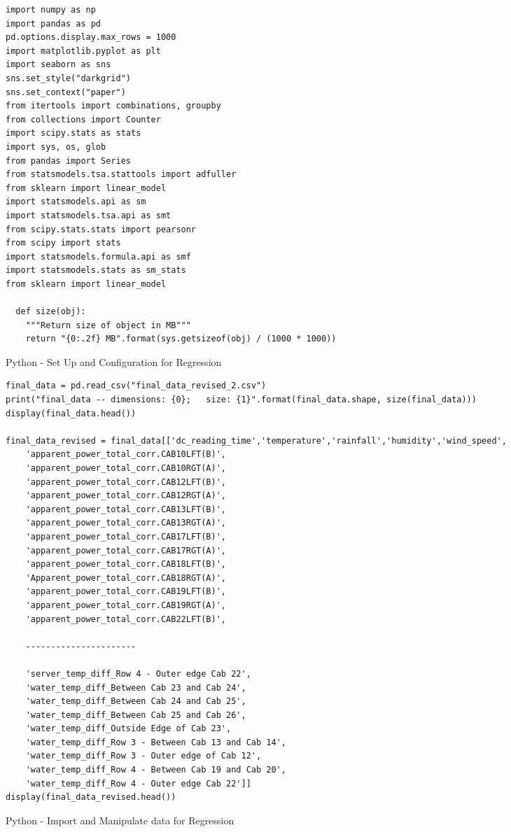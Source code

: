 \documentclass[12pt]{scrartcl}
\begin{document}
\begin{listing}[H]
\begin{verbatim}
import numpy as np
import pandas as pd 
pd.options.display.max_rows = 1000
import matplotlib.pyplot as plt
import seaborn as sns
sns.set_style("darkgrid")
sns.set_context("paper")
from itertools import combinations, groupby
from collections import Counter
import scipy.stats as stats
import sys, os, glob
from pandas import Series
from statsmodels.tsa.stattools import adfuller
from sklearn import linear_model
import statsmodels.api as sm
import statsmodels.tsa.api as smt
from scipy.stats.stats import pearsonr
from scipy import stats
import statsmodels.formula.api as smf
import statsmodels.stats as sm_stats
from sklearn import linear_model

  def size(obj):
    """Return size of object in MB"""
    return "{0:.2f} MB".format(sys.getsizeof(obj) / (1000 * 1000))
\end{verbatim}
\caption{Python - Set Up and Configuration for Regression}
\label{list:[Python - Set up and Configuration for Regression]}
\end{listing}

\begin{listing}[H]
\begin{verbatim}
final_data = pd.read_csv("final_data_revised_2.csv")
print("final_data -- dimensions: {0};   size: {1}".format(final_data.shape, size(final_data)))
display(final_data.head())

final_data_revised = final_data[['dc_reading_time','temperature','rainfall','humidity','wind_speed',
    'apparent_power_total_corr.CAB10LFT(B)',
    'apparent_power_total_corr.CAB10RGT(A)',
    'apparent_power_total_corr.CAB12LFT(B)',
    'apparent_power_total_corr.CAB12RGT(A)',
    'apparent_power_total_corr.CAB13LFT(B)',
    'apparent_power_total_corr.CAB13RGT(A)',
    'apparent_power_total_corr.CAB17LFT(B)',
    'apparent_power_total_corr.CAB17RGT(A)',
    'apparent_power_total_corr.CAB18LFT(B)',
    'Apparent_power_total_corr.CAB18RGT(A)',
    'apparent_power_total_corr.CAB19LFT(B)',
    'apparent_power_total_corr.CAB19RGT(A)',
    'apparent_power_total_corr.CAB22LFT(B)',

	----------------------

    'server_temp_diff_Row 4 - Outer edge Cab 22',
    'water_temp_diff_Between Cab 23 and Cab 24',
    'water_temp_diff_Between Cab 24 and Cab 25',
    'water_temp_diff_Between Cab 25 and Cab 26',
    'water_temp_diff_Outside Edge of Cab 23',
    'water_temp_diff_Row 3 - Between Cab 13 and Cab 14',
    'water_temp_diff_Row 3 - Outer edge of Cab 12',
    'water_temp_diff_Row 4 - Between Cab 19 and Cab 20',
    'water_temp_diff_Row 4 - Outer edge Cab 22']]
display(final_data_revised.head())

\end{verbatim}
\caption{Python - Import and Manipulate data for Regression}
\label{list:[Python - Import and Manipulate data for Regression]}
\end{listing}
\end{document}
